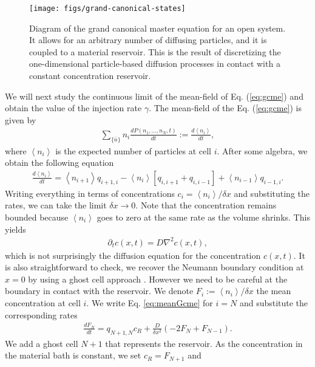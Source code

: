 \documentclass[10pt,twocolumn]{revtex4-1}
\newcommand{\mean}[1]{\left\langle{#1}\right\rangle}
\begin{document}
	\begin{figure}
		\texttt{[image: figs/grand-canonical-states]}
		\caption{Diagram of the grand canonical master equation for an open system. It allows for an arbitrary number of diffusing particles, and it is coupled to a material reservoir. This is the result of discretizing the one-dimensional particle-based diffusion processes in contact with a constant concentration reservoir.}
		\label{fig:diagDiscret}
	\end{figure}
	
	We will next study the continuous limit of the mean-field of Eq. (\ref{eq:gcme}) and obtain the value of the injection rate $\gamma$. The mean-field of the Eq. (\ref{eq:gcme}) is given by
	\begin{align}
	\sum\limits_{\{\bar{n}\}}n_{i}\frac{dP(n_1,...,n_N,t)}{dt}:=\frac{d \mean{n_{i}}}{dt},
	\end{align}
	where $\mean{n_{i}}$ is the expected number of particles at cell $i$. After some algebra, we obtain the following equation \cite{del2018grand,heuett2006grand} 
	\begin{align}
	\frac{d \mean{n_{i}}}{dt}= \mean{n_{i+1}} q_{i+1,i}- \mean{n_{i}} [q_{i,i+1}+q_{i,i-1}]+ \mean{n_{i-1}} q_{i-1,i}.
	\label{eq:meanGcme}
	\end{align}
	Writing everything in terms of concentrations $c_i=\mean{n_{i}}/\delta x$ and substituting the rates, we can take the limit $\delta x \rightarrow 0$. Note that the concentration remains bounded because $\mean{n_{i}}$ goes to zero at the same rate as the volume shrinks. This yields \cite{del2018grand}
	\begin{align}
	\partial_{t} c(x,t)=D\nabla^2 c(x,t),
	\label{eq:diff}
	\end{align}    
	which is not surprisingly the diffusion equation for the concentration $c(x,t)$. It is also straightforward to check, we recover the Neumann boundary condition at $x=0$ by using a ghost cell approach \cite{leveque2007finite}. However we need to be careful at the boundary in contact with the reservoir. We denote $F_i:=\mean{n_i}/\delta x$ the mean concentration at cell $i$. We write Eq. \ref{eq:meanGcme} for $i=N$ and substitute the corresponding rates
	\begin{align*}
	\frac{dF_{N}}{dt}=q_{N+1,N}c_R+\frac{D}{\delta x^{2}}(-2F_{N}+F_{N-1}).
	\end{align*}
	We add a ghost cell $N+1$ that represents the reservoir. As the concentration in the material bath is constant, we set $c_{R}=F_{N+1}$ and
\end{document}
